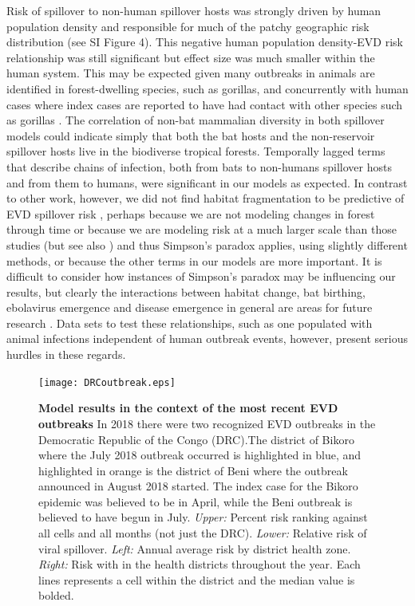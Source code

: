 \documentclass[a4paper,twoside, onecolumn]{article}
\begin{document}
	Risk of spillover to non-human spillover hosts was strongly driven by human population density and responsible for much of the patchy geographic risk distribution (see SI Figure 4). This negative human population density-EVD risk relationship was still significant but effect size was much smaller within the human system. This may be expected given many outbreaks in animals are identified in forest-dwelling species, such as gorillas, and concurrently with human cases where index cases are reported to have had contact with other species such as gorillas \cite{Leroy2004}. The correlation of non-bat mammalian diversity in both spillover models could indicate simply that both the bat hosts and the non-reservoir spillover hosts live in the biodiverse tropical forests. Temporally lagged terms that describe chains of infection, both from bats to non-humans spillover hosts and from them to humans, were significant in our models as expected. In contrast to other work, however, we did not find habitat fragmentation to be predictive of EVD spillover risk \cite{Rulli2017}, perhaps because we are not modeling changes in forest through time or because we are modeling risk at a much larger scale than those studies (but see also \cite{Wilkinson2018}) and thus Simpson's paradox applies, using slightly different methods, or because the other terms in our models are more important. It is difficult to consider how instances of Simpson's paradox may be influencing our results, but clearly the interactions between habitat change, bat birthing, ebolavirus emergence and disease emergence in general are areas for future research \cite{Rulli2017, Wilkinson2018, Han2016}. Data sets to test these relationships, such as one populated with animal infections independent of human outbreak events, however, present serious hurdles in these regards. \par
	\begin{figure}[h!]
		\centering
		\texttt{[image: DRCoutbreak.eps]}
		\caption{\textbf{Model results in the context of the most recent EVD outbreaks} In 2018 there were two recognized EVD outbreaks in the Democratic Republic of the Congo (DRC).The district of Bikoro where the July 2018 outbreak occurred is highlighted in blue, and highlighted in orange is the district of Beni where the outbreak announced in August 2018 started. The index case for the Bikoro epidemic was believed to be in April, while the Beni outbreak is believed to have begun in July. \textit{Upper:} Percent risk ranking against all cells and all months (not just the DRC). \textit{Lower:} Relative risk of viral spillover. \textit{Left:} Annual average risk by district health zone. \textit{Right:} Risk with in the health districts throughout the year. Each lines represents a cell within the district and the median value is bolded.}
		\label{fig:F_DRC_breakdown}
	\end{figure}
\end{document}
